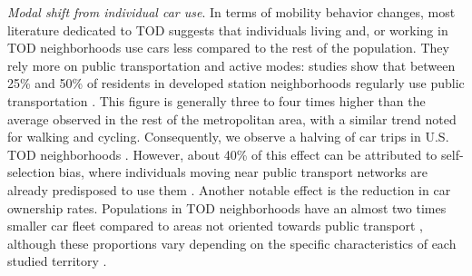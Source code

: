 \begin{refsegment}
\textsl{Modal shift from individual car use}. In terms of mobility behavior changes, most literature dedicated to \acrshort{TOD} suggests that individuals living and, or working in \acrshort{TOD} neighborhoods use cars less compared to the rest of the population. They rely more on public transportation and active modes: studies show that between 25\% and 50\% of residents in developed station neighborhoods regularly use public transportation \textcolor{blue}{\autocites[61]{lund_travel_2004}[40]{evans_transit-oriented_2007}[5, 15]{cervero_vehicle_2008}[62]{kamruzzaman_advance_2014}[152]{kamruzzaman_patterns_2014}}. This figure is generally three to four times higher than the average observed in the rest of the metropolitan area, with a similar trend noted for walking and cycling. Consequently, we observe a halving of car trips in U.S. \acrshort{TOD} neighborhoods \textcolor{blue}{\autocite[14]{cervero_vehicle_2008}}. However, about 40\% of this effect can be attributed to self-selection bias, where individuals moving near public transport networks are already predisposed to use them \textcolor{blue}{\autocites[2082]{cervero_transit-oriented_2007}[50]{laham_nonwork_2017}}. Another notable effect is the reduction in car ownership rates. Populations in \acrshort{TOD} neighborhoods have an almost two times smaller car fleet compared to areas not oriented towards public transport \textcolor{blue}{\autocite[50]{arrington_effects_2008}}, although these proportions vary depending on the specific characteristics of each studied territory \textcolor{blue}{\autocite[79]{lund_travel_2004}}.%


\end{refsegment}
